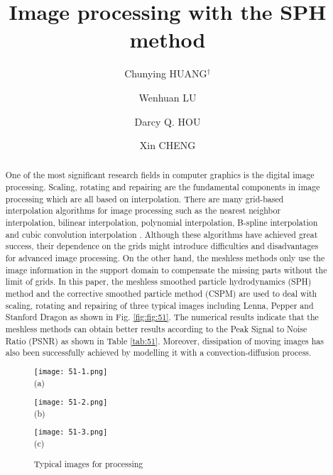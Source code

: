 \documentclass[10pt]{article}
\title{Image processing with the SPH method}
\date{}
\author[1]{Chunying HUANG$^\dagger$}
\author[1]{Wenhuan LU}
\author[2]{Darcy Q. HOU}
\author[2]{Xin CHENG}
\affil[1]{School of Computer Software, Tianjin University, China}
\affil[2]{School of Computer Science and Technology, Tianjin University, China}
\affil[$\relax$]{\email{\dagger}{cyhuang416@163.com}}
\begin{document}
\maketitle


\begin{abstract}
One of the most significant research fields in computer graphics is the digital image processing. Scaling, rotating and repairing are the fundamental components in image processing which are all based on interpolation. There are many grid-based interpolation algorithms for image processing such as the nearest neighbor interpolation, bilinear interpolation, polynomial interpolation, B-spline interpolation and cubic convolution interpolation \cite{parker1983comparison,carey1999regularity}. Although these algorithms have achieved great success, their dependence on the grids might introduce difficulties and disadvantages for advanced image processing. On the other hand, the meshless methods only use the image information in the support domain to compensate the missing parts without the limit of grids. In this paper, the meshless smoothed particle hydrodynamics (SPH) method and the corrective smoothed particle method (CSPM) are used to deal with scaling, rotating and repairing of three typical images including Lenna, Pepper and Stanford Dragon as shown in Fig. \ref{fig:fig:51}. The numerical results indicate that the meshless methods can obtain better results according to the Peak Signal to Noise Ratio (PSNR) as shown in Table \ref{tab:51}. Moreover, dissipation of moving images has also been successfully achieved by modelling it with a convection-diffusion process. 

\begin{figure}[!htb]
\begin{minipage}[t]{0.33\linewidth}
\centering
\texttt{[image: 51-1.png]}\\
(a)
\end{minipage}
\begin{minipage}[t]{0.33\linewidth}
\centering
\texttt{[image: 51-2.png]}\\
(b)
\end{minipage}
\begin{minipage}[t]{0.33\linewidth}
\centering
\texttt{[image: 51-3.png]}\\
(c)
\end{minipage}
\caption{Typical images for processing}\label{fig:fig:51}
\end{figure}





\end{abstract}
\end{document}
